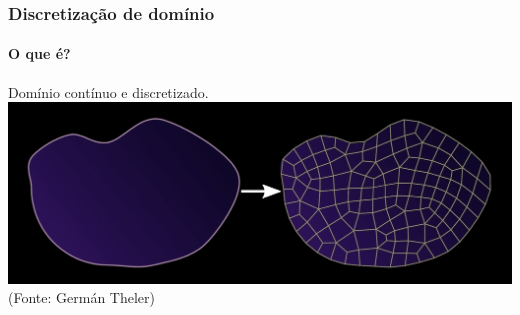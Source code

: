 \documentclass[svgnames,smaller,table]{beamer}
\begin{document}
{
  
\begin{frame}
  \frametitle{Discretização de domínio}
  \framesubtitle{O que é?}
\centering
Domínio contínuo e discretizado.
\\
\vspace{0.5cm}
  \centering
  \includegraphics[scale=1.1]{../figuras/dom-neg.png}
  \vspace{0.5cm}
  \scriptsize(Fonte: Germán Theler)
\end{frame}
}
%  
%
\end{document}
